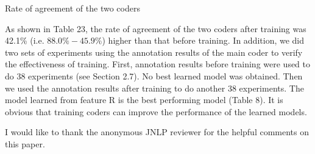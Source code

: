 \documentclass[english]{jnlp_1.3e}
\begin{document}
\begin{table}[t]
\caption{Rate of agreement of the two coders}

\end{table}


As shown in Table 23, the rate of agreement of the two coders after training 
was 42.1\% (i.e. $88.0\% - 45.9\%$) higher than that before training. 
In addition, we did two sets of experiments using the annotation results of 
the main coder to verify the effectiveness of training. First, annotation results 
before training were used to do 38 experiments (see Section 2.7). No best learned
model was obtained. Then we used the annotation results after training to do another 
38 experiments. The model learned from feature R is the best performing model (Table 8).
It is obvious that training coders can improve the performance of the learned models.




\acknowledgment

I would like to thank the anonymous JNLP reviewer for the helpful comments on this paper.
\end{document}

